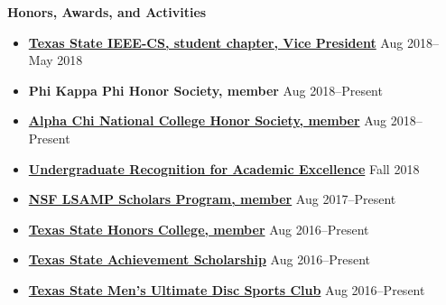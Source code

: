 \documentclass[10pt]{article}
\newlength{\headingborderwidth}
\newcommand{\resheading}[1]{
    \begin{mdframed}[
        backgroundcolor=black!15,
        linewidth=\headingborderwidth,
        innertopmargin=4pt,
        innerbottommargin=4pt,
        skipabove=6pt,
        skipbelow=2pt]
        \textbf{\large #1}
    \end{mdframed}
}
\newcommand{\resdateitem}[2]{
	\item \textbf{#1} \hfill #2 \\
}
\newenvironment{resitemize}{
    \vspace{-6pt}
    \begin{itemize}
    \setlength\itemsep{-2pt}
}{
    \end{itemize}
}
\begin{document}
\begin{NoHyper}
    
    
    

%   
%

\resheading{Honors, Awards, and Activities}

\begin{resitemize}
    \resdateitem{\href{https://www.facebook.com/TXST.IEEE/}{Texas State IEEE-CS, student chapter, Vice President}}{Aug 2018--May 2018}
    \resdateitem{Phi Kappa Phi Honor Society, member}{Aug 2018--Present}
    \resdateitem{\href{https://ims.alphachihonor.org/}{Alpha Chi National College Honor Society, member}}{Aug 2018--Present}
    \resdateitem{\href{http://www.math.txstate.edu/about/archive/2017-18/awards-day.html}{Undergraduate Recognition for Academic Excellence}}{Fall 2018}
    \resdateitem{\href{http://hlsamp.cose.txstate.edu/}{NSF LSAMP Scholars Program, member}}{Aug 2017--Present}
    \resdateitem{\href{http://www.txstate.edu/honors/}{Texas State Honors College, member}}{Aug 2016--Present}
    \resdateitem{\href{http://www.finaid.txstate.edu/scholarships/freshman/assured.html}{Texas State Achievement Scholarship}}{Aug 2016--Present}
    \resdateitem{\href{http://www.campusrecreation.txstate.edu/sport-clubs/club-pages/Ultimate-Disc.html}{Texas State Men's Ultimate Disc Sports Club}}{Aug 2016--Present}


\end{resitemize}
\end{NoHyper}
\end{document}
